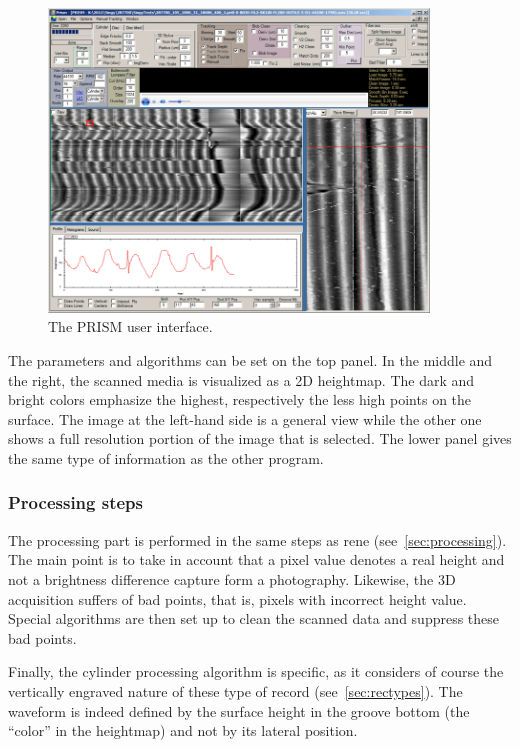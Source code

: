 \begin{figure}[!ht]
\centering
\includegraphics[width=0.9\textwidth]{images/prism-gui}
\caption{The PRISM user interface.}
\label{fig:prismgui}
\end{figure}

The parameters and algorithms can be set on the top panel. In the middle and the right, the scanned media is visualized as a 2D heightmap. The dark and bright colors emphasize the highest, respectively the less high points on the surface. The image at the left-hand side is a general view while the other one shows a full resolution portion of the image that is selected. The lower panel gives the same type of information as the other program.

\subsubsection{Processing steps}

The processing part is performed in the same steps as \gls{rene} (see~\autoref{sec:processing}). The main point is to take in account that a pixel value denotes a real height and not a brightness difference capture form a photography. Likewise, the 3D acquisition suffers of bad points, that is, pixels with incorrect height value. Special algorithms are then set up to clean the scanned data and suppress these bad points.

Finally, the cylinder processing algorithm is specific, as it considers of course the vertically engraved nature of these type of record (see~\autoref{sec:rectypes}). The waveform is indeed defined by the surface height in the groove bottom (the ``color'' in the heightmap) and not by its lateral position.

